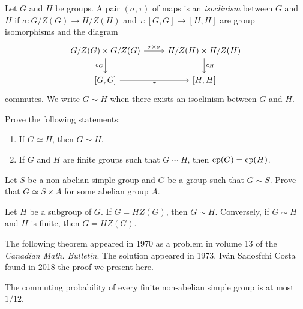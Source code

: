 \begin{exercise}
\label{xca:isoclinism}
    Let $G$ and $H$ be groups. 
    A pair $(\sigma,\tau)$ of maps is an \emph{isoclinism}
    between $G$ and $H$ if 
    $\sigma\colon G/Z(G)\to H/Z(H)$ and  
    $\tau\colon [G,G]\to [H,H]$ are group isomorphisms and 
    the diagram
    \begin{equation}
    \label{eq:isoclinism}
    \begin{tikzcd}
	{G/Z(G)\times G/Z(G)} & {H/Z(H)\times H/Z(H)} \\
	{[G,G]} & {[H,H]}
	\arrow["{\sigma\times\sigma }", from=1-1, to=1-2]
	\arrow["{c_H}", from=1-2, to=2-2]
	\arrow["{c_G}"', from=1-1, to=2-1]
	\arrow["\tau"', from=2-1, to=2-2]
    \end{tikzcd}
    \end{equation} 
    commutes. We write $G\sim H$ when there exists 
    an isoclinism between $G$ and $H$. 
    
    Prove the following statements:
    \begin{enumerate}
        \item If $G\simeq H$, then $G\sim H$.
        \item If $G$ and $H$ are finite groups such that $G\sim H$, then $\operatorname{cp}(G)=\operatorname{cp}(H)$. 
    \end{enumerate}
\end{exercise}

\begin{exercise}
\label{xca:isoclinism_simple}
    Let $S$ be a non-abelian simple group and
    $G$ be a group such that $G\sim S$. Prove that 
    $G\simeq S\times A$ for some abelian group $A$.
\end{exercise}

\begin{exercise}
\label{xca:isoclinism_factorization}
    Let $H$ be a subgroup of $G$. If $G=HZ(G)$, then $G\sim H$. 
    Conversely, if $G\sim H$ and $H$ is finite, then 
    $G=HZ(G)$. 
\end{exercise}

The following theorem appeared in 1970 as a problem in 
volume 13 of the \textit{Canadian Math. Bulletin}. The solution
appeared in 1973. 
Iv\'an Sadosfchi Costa found in 2018 
the proof we present here. 

\begin{theorem}[Dixon]
    \label{thm:Dixon}
    The commuting probability of every finite 
    non-abelian simple group is at most $1/12$. 
\end{theorem}

